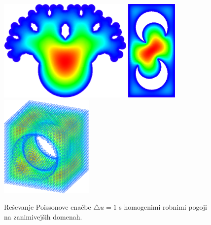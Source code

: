 \documentclass[12pt,a4paper,twoside]{article}
\theoremstyle{definition} %
\theoremstyle{plain} %
\numberwithin{equation}{section}
\newcommand{\lap}{\triangle}
\begin{document}
\begin{figure}[h]
  \centering
  \includegraphics[height=5cm]{images/poisson_weird1.png}
  \hspace{10pt}
  \includegraphics[height=5cm]{images/poisson_weird2.png}
  \hspace{10pt}
  \includegraphics[height=5cm]{images/poisson_weird3.png}
  \caption[Reševanje $\lap u = 1$ na zanimivejših domenah.]{Reševanje Poissonove enačbe $\lap u = 1$ s homogenimi robnimi pogoji na
  zanimivejših domenah.}
  \label{fig:poisson-square-weird}
\end{figure}
\end{document}
